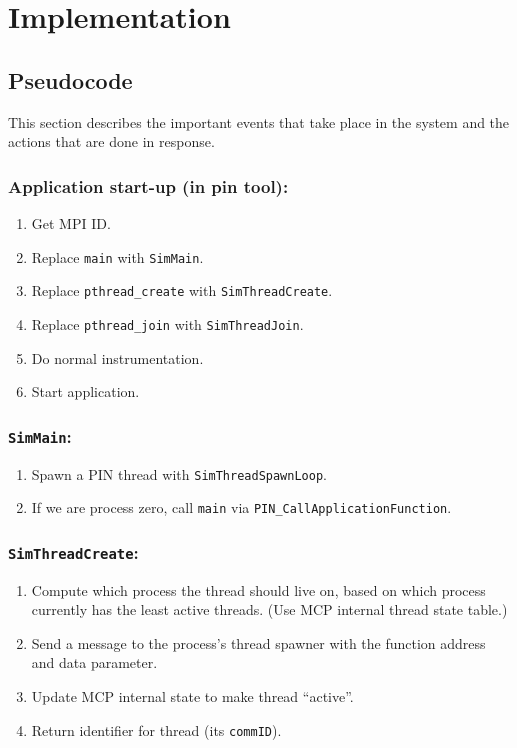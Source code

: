 \documentclass[10pt,twocolumn]{article}
\begin{document}
\section{Implementation}
\label{sec:implementation}

\subsection{Pseudocode}
\label{sec:pseudocode}

This section describes the important events that take place in the
system and the actions that are done in response.

\subsubsection{Application start-up (in pin tool):}
\begin{enumerate}
\item Get MPI ID.
\item Replace \texttt{main} with \texttt{SimMain}.
\item Replace \texttt{pthread\_create} with \texttt{SimThreadCreate}.
\item Replace \texttt{pthread\_join} with \texttt{SimThreadJoin}.
\item Do normal instrumentation.
\item Start application.
\end{enumerate}

\subsubsection{\texttt{SimMain}:}
\begin{enumerate}
\item Spawn a PIN thread with \texttt{SimThreadSpawnLoop}.
\item If we are process zero, call \texttt{main} via
  \texttt{PIN\_CallApplicationFunction}.
\end{enumerate}

\subsubsection{\texttt{SimThreadCreate}:}
\begin{enumerate}
\item Compute which process the thread should live on, based on which
  process currently has the least active threads. (Use MCP internal
  thread state table.)
\item Send a message to the process's thread spawner with the function
  address and data parameter.
\item Update MCP internal state to make thread ``active''.
\item Return identifier for thread (its \texttt{commID}).
\end{enumerate}
\end{document}
